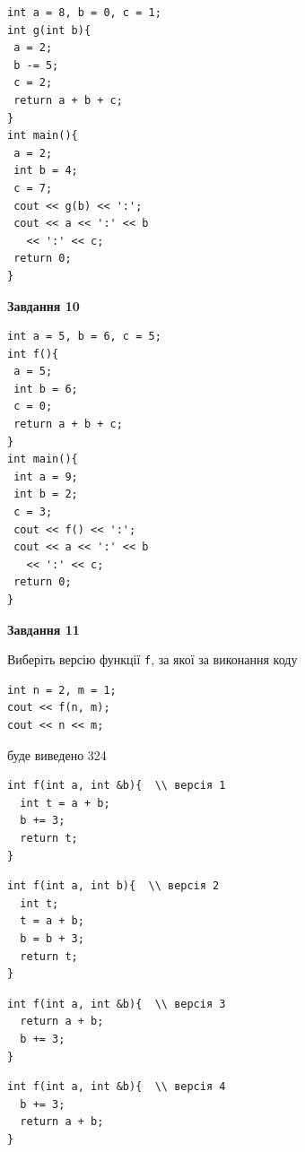 \documentclass[12pt, ukrainian]{article}
\def\code#1{\Verb!#1!}
\begin{document}
{\begin {large}
\begin{minipage}[t]{7.0cm}
\begin{verbatim}
int a = 8, b = 0, c = 1;
int g(int b){
 a = 2;
 b -= 5;
 c = 2;
 return a + b + c;
}
int main(){
 a = 2;
 int b = 4;
 c = 7;
 cout << g(b) << ':';
 cout << a << ':' << b 
   << ':' << c;
 return 0;
}
\end{verbatim}



\begin{center}
\textbf{Завдання 10}
\end{center}
\vspace{-8mm}

\begin{verbatim}
int a = 5, b = 6, c = 5;
int f(){
 a = 5;
 int b = 6;
 c = 0;
 return a + b + c;
}
int main(){
 int a = 9;
 int b = 2;
 c = 3;
 cout << f() << ':';
 cout << a << ':' << b 
   << ':' << c;
 return 0;
}
\end{verbatim}

\end{minipage}
\vline \hspace{1mm}
\begin{minipage}[t]{11.0cm}

\begin{center}
\textbf{Завдання 11}
\end{center}
Виберіть версію функції \code{f}, за якої за виконання коду
\begin{verbatim}
int n = 2, m = 1;
cout << f(n, m);
cout << n << m;
\end{verbatim}

буде виведено 324

\begin{verbatim}
int f(int a, int &b){  \\ версія 1
  int t = a + b;
  b += 3;
  return t;
}
\end{verbatim}

\vspace{-8mm}\begin{verbatim}
int f(int a, int b){  \\ версія 2
  int t;
  t = a + b;
  b = b + 3;
  return t;
}
\end{verbatim}

\vspace{-8mm}\begin{verbatim}
int f(int a, int &b){  \\ версія 3
  return a + b;
  b += 3;
}
\end{verbatim}

\vspace{-8mm}\begin{verbatim}
int f(int a, int &b){  \\ версія 4
  b += 3;
  return a + b;
}
\end{verbatim}




\end{minipage}
\end{large}}
\end{document}
